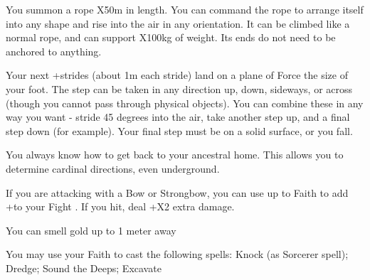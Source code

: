{\LITURGY [
  Name= Ropework,
  Link=kismet-liturgy-ropework,
  Paradigm= Entropy ,
  Save=  N ,
  Duration= \SUMDICE Minutes ,
  Counter=  n/a  ,
  Keywords= None ,
  Target=   Close object
]



You summon a rope \DICE X50m in length.  You can command the rope to arrange itself into any shape and rise into the air in any orientation.  It can be climbed like a normal rope, and can support \DICE X100kg of weight.  Its ends do not need to be anchored to anything.

\LITURGY [
  Name= Vaulting Step,
  Link=kismet-liturgy-vaulting step,
  Paradigm= Force ,
  Save=  N ,
  Duration= 0 ,
  Counter=  n/a  ,
  Keywords= None ,
  Target=   Self
]



Your next \DICE+\DICE strides (about 1m each stride) land on a plane of Force the size of your foot.  The step can be taken in any direction up, down, sideways, or across (though you cannot pass through physical objects).  You can combine these in any way you want - stride 45 degrees into the air, take another step up, and a final step down (for example).  Your final step must be on a solid surface, or you fall. 



\GOD[
Name=Odysseus,
Link=small-god-odysseus,
GodOf=God of Homecomings,
Holy=an iron wheel hanging from a bowstring necklace
]


You always know how to get back to your ancestral home. This allows you to determine cardinal directions, even underground.


If you are attacking with a Bow or Strongbow, you can use up to \LVL Faith to add +\SUMDICE to your Fight \RO.  If you hit, deal +\DICE X2 extra damage.




\GOD[
Name=Umwansh,
Link=small-god-umwansh,
GodOf=Lord of Many Treasures,
Holy=a coin (gold is best) with a hole through the center worn on a chain
]


You can smell gold up to 1 meter away


You may use your Faith to cast the following spells:  Knock (as Sorcerer spell); Dredge; Sound the Deeps; Excavate

}
